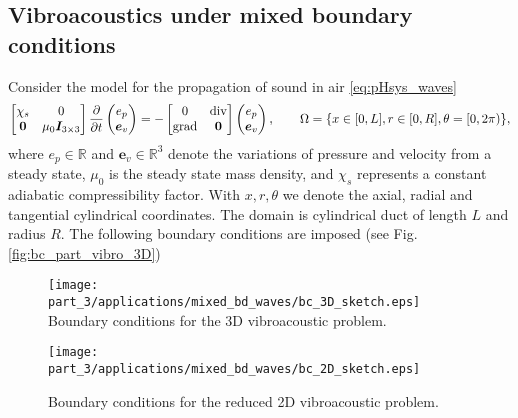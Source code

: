 \subsection{Vibroacoustics under mixed boundary conditions}
Consider the model for the propagation of sound in air \ref{eq:pHsys_waves}
\begin{equation}
\begin{bmatrix}
\chi_s & 0 \\
\bm{0} & \mu_0 \bm{I}_{3\times 3} \\
\end{bmatrix}
\diffp{}{t}
\begin{pmatrix}
e_p \\
\bm{e}_v \\
\end{pmatrix} = -
\begin{bmatrix}
0 & \div \\
\grad & \bm{0} \\
\end{bmatrix}
\begin{pmatrix}
e_p \\
\bm{e}_v \\
\end{pmatrix}, \qquad \Omega = \{x \in [0, L], r \in [0, R], \theta = [0, 2 \pi)\},
\end{equation}
where $e_p \in \mathbb{R}$  and $\bm{e}_v \in \mathbb{R}^3$ denote the variations of pressure and velocity from a steady state, $\mu_0$ is the steady state mass density, and $\chi_s$ represents a constant adiabatic compressibility factor. With $x, r, \theta$ we denote the axial, radial and tangential cylindrical coordinates.  The domain is cylindrical duct of length $L$ and radius $R$. The following boundary conditions are imposed (see Fig. \ref{fig:bc_part_vibro_3D})

\begin{figure}[t]
	\begin{minipage}[b]{0.5\linewidth}
		\centering
		\texttt{[image: part\_3/applications/mixed\_bd\_waves/bc\_3D\_sketch.eps]} \\
		\caption{Boundary conditions for the 3D vibroacoustic problem.}
		\label{fig:bc_part_vibro_3D}
	\end{minipage}
	\hspace{0.5cm}
	\begin{minipage}[b]{0.5\linewidth}
		\centering
	\texttt{[image: part\_3/applications/mixed\_bd\_waves/bc\_2D\_sketch.eps]} \\
	\caption{Boundary conditions for the reduced 2D vibroacoustic problem.}
	\label{fig:bc_part_vibro_2D}
	\end{minipage}
\end{figure}


